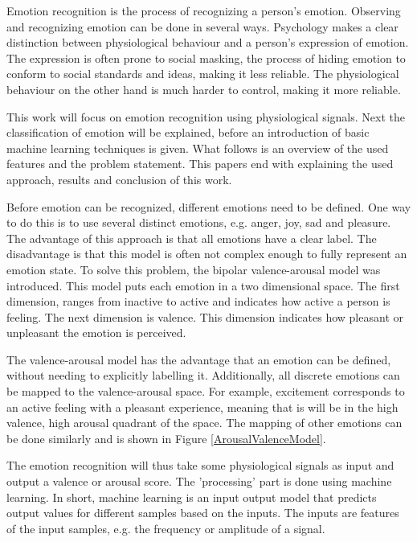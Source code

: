 
Emotion recognition is the process of recognizing a person's emotion. Observing and recognizing emotion can be done in several ways. Psychology makes a clear distinction between physiological behaviour and a person's expression of emotion. The expression is often prone to social masking, the process of hiding emotion to conform to social standards and ideas, making it less reliable. The physiological behaviour on the other hand is much harder to control, making it more reliable. 

\npar

This work will focus on emotion recognition using physiological signals. Next the classification of emotion will be explained, before an introduction of basic machine learning techniques is given. What follows is an overview of the used features and the problem statement. This papers end with explaining the used approach, results and conclusion of this work.

\npar

Before emotion can be recognized, different emotions need to be defined. One way to do this is to use several distinct emotions, e.g. anger, joy, sad and pleasure. The advantage of this approach is that all emotions have a clear label. The disadvantage is that this model is often not complex enough to fully represent an emotion state. To solve this problem, the bipolar valence-arousal model was introduced. This model puts each emotion in a two dimensional space. The first dimension, ranges from inactive to active and indicates how active a person is feeling. The next dimension is valence. This dimension indicates how pleasant or unpleasant the emotion is perceived. 

\npar

The valence-arousal model has the advantage that an emotion can be defined, without needing to explicitly labelling it. Additionally, all discrete emotions can be mapped to the valence-arousal space. For example, excitement corresponds to an active feeling with a pleasant experience, meaning that is will be in the high valence, high arousal quadrant of the space. The mapping of other emotions can be done similarly and is shown in Figure \ref{ArousalValenceModel}.


\npar

The emotion recognition will thus take some physiological signals as input and output a valence or arousal score. The 'processing' part is done using machine learning. In short, machine learning is an input output model that predicts output values for different samples based on the inputs. The inputs are features of the input samples, e.g. the frequency or amplitude of a signal.

